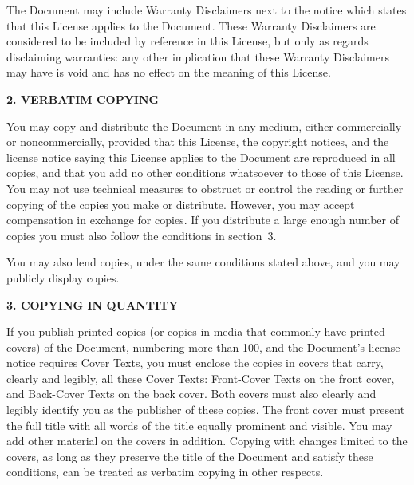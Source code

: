 The Document may include Warranty Disclaimers next to the notice which
states that this License applies to the Document.  These Warranty
Disclaimers are considered to be included by reference in this
License, but only as regards disclaiming warranties: any other
implication that these Warranty Disclaimers may have is void and has
no effect on the meaning of this License.


\begin{center}
{\Large\bf 2. VERBATIM COPYING\par}
{}
\end{center}

You may copy and distribute the Document in any medium, either
commercially or noncommercially, provided that this License, the
copyright notices, and the license notice saying this License applies
to the Document are reproduced in all copies, and that you add no other
conditions whatsoever to those of this License.  You may not use
technical measures to obstruct or control the reading or further
copying of the copies you make or distribute.  However, you may accept
compensation in exchange for copies.  If you distribute a large enough
number of copies you must also follow the conditions in section~3.

You may also lend copies, under the same conditions stated above, and
you may publicly display copies.


\begin{center}
{\Large\bf 3. COPYING IN QUANTITY\par}
{}
\end{center}


If you publish printed copies (or copies in media that commonly have
printed covers) of the Document, numbering more than 100, and the
Document's license notice requires Cover Texts, you must enclose the
copies in covers that carry, clearly and legibly, all these Cover
Texts: Front-Cover Texts on the front cover, and Back-Cover Texts on
the back cover.  Both covers must also clearly and legibly identify
you as the publisher of these copies.  The front cover must present
the full title with all words of the title equally prominent and
visible.  You may add other material on the covers in addition.
Copying with changes limited to the covers, as long as they preserve
the title of the Document and satisfy these conditions, can be treated
as verbatim copying in other respects.


